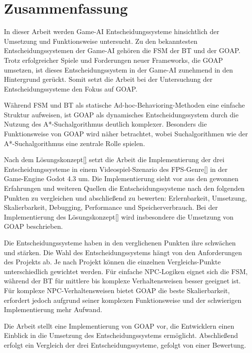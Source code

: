 \chapter{Zusammenfassung}
\label{chap:zusammenfassung}

In dieser Arbeit werden Game-AI Entscheidungssysteme hinsichtlich der Umsetzung und Funktionsweise untersucht. Zu den bekanntesten Entscheidungssystemen der Game-AI geh\"{o}ren die FSM der BT und der GOAP. Trotz erfolgreicher Spiele und Forderungen neuer Frameworks, die GOAP umsetzen, ist dieses Entscheidungssystem in der Game-AI zunehmend in den Hintergrund ger\"{u}ckt. Somit setzt die Arbeit bei der Untersuchung der Entscheidungssysteme den Fokus auf GOAP.

W\"{a}hrend FSM und BT als statische Ad-hoc-Behavioring-Methoden eine einfache Struktur aufweisen, ist GOAP als dynamisches Entscheidungssystem durch die Nutzung des A*-Suchalgorithmus deutlich komplexer. Besonders die Funktionsweise von GOAP wird n\"{a}her betrachtet, wobei Suchalgorithmen wie der A*-Suchalgorithmus eine zentrale Rolle spielen.

Nach dem L\"{o}sungskonzept\ref{} setzt die Arbeit die Implementierung der drei Entscheidungssysteme in einem Videospiel-Szenario des FPS-Genre\ref{} in der Game-Engine Godot 4.3 um. Die Implementierung sieht vor aus den gewonnen Erfahrungen und weiteren Quellen die Entscheidungssysteme nach den folgenden Punkten zu vergleichen und abschlie\ss{}end zu bewerten: Erlernbarkeit, Umsetzung, Skalierbarkeit, Debugging, Performance und Speicherverbrauch. Bei der Implementierung des L\"{o}sungskonzept\ref{} wird insbesondere die Umsetzung von GOAP beschrieben.

Die Entscheidungssysteme haben in den verglichenen Punkten ihre schw\"{a}chen und st\"{a}rken. Die Wahl des Entscheidungssystems h\"{a}ngt von den Anforderungen des Projekts ab. Je nach Projekt k\"{o}nnen die einzelnen Vergleichs-Punkte unterschiedlich gewichtet werden. F\"{u}r einfache NPC-Logiken eignet sich die FSM, w\"{a}hrend der BT f\"{u}r mittlere bis komplexe Verhaltensweisen besser geeignet ist. F\"{u}r komplexe NPC-Verhaltensweisen bietet GOAP die beste Skalierbarkeit, erfordert jedoch aufgrund seiner komplexen Funktionsweise und der schwierigen Implementierung mehr Aufwand.

Die Arbeit stellt eine Implementierung von GOAP vor, die Entwicklern einen Einblick in die Umsetzung des Entscheidungssystems erm\"{o}glicht. Abschlie\ss{}end erfolgt ein Vergleich der drei Entscheidungssysteme, gefolgt von einer Bewertung.